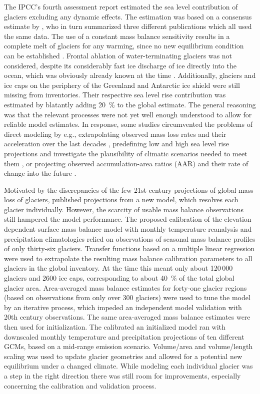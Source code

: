     The IPCC's fourth assessment report \citep{IPCC2007} estimated the sea level contribution of glaciers excluding any dynamic effects. The estimation was based on a consensus estimate by \citet{Kaser2006}, who in turn summarized three different publications which all used the same data. The use of a constant mass balance sensitivity results in a complete melt of glaciers for any warming, since no new equilibrium condition can be established \citep{Raper2006, Pfeffer2008}. Frontal ablation of water-terminating glaciers was not considered, despite its considerably fast ice discharge of ice directly into the ocean, which was obviously already known at the time \citep{Pfeffer2008}. Additionally, glaciers and ice caps on the periphery of the Greenland and Antarctic ice shield were still missing from inventories. Their respective sea level rise contribution was estimated by blatantly adding \SI{20}{\percent} to the global estimate. The general reasoning was that the relevant processes were not yet well enough understood to allow for reliable model estimates. In response, some studies circumvented the problems of direct modeling by e.g., extrapolating observed mass loss rates and their acceleration over the last decades \citep{Meier2007}, predefining low and high sea level rise projections and investigate the plausibility of climatic scenarios needed to meet them \citep{Pfeffer2008}, or projecting observed accumulation-area ratios (AAR) and their rate of change into the future \citep{Bahr2009}.

    Motivated by the discrepancies of the few 21st century projections of global mass loss of glaciers, \citet{Radic2011} published projections from a new model, which resolves each glacier individually. However, the scarcity of usable mass balance observations still hampered the model performance. The proposed calibration of the elevation dependent surface mass balance model with monthly temperature reanalysis and precipitation climatologies relied on observations of seasonal mass balance profiles of only thirty-six glaciers. Transfer functions based on a multiple linear regression were used to extrapolate the resulting mass balance calibration parameters to all glaciers in the global inventory. At the time this meant only about 120\,000 glaciers and 2600 ice caps, corresponding to about \SI{40}{\percent} of the total global glacier area. Area-averaged mass balance estimates for forty-one glacier regions (based on observations from only over 300 glaciers) were used to tune the model by an iterative process, which impeded an independent model validation with 20th century observations. The same area-averaged mass balance estimates were then used for initialization. The calibrated an initialized model ran with downscaled monthly temperature and precipitation projections of ten different GCMs, based on a mid-range emission scenario. Volume/area and volume/length scaling was used to update glacier geometries and allowed for a potential new equilibrium under a changed climate. While modeling each individual glacier was a step in the right direction there was still room for improvements, especially concerning the calibration and validation process.


